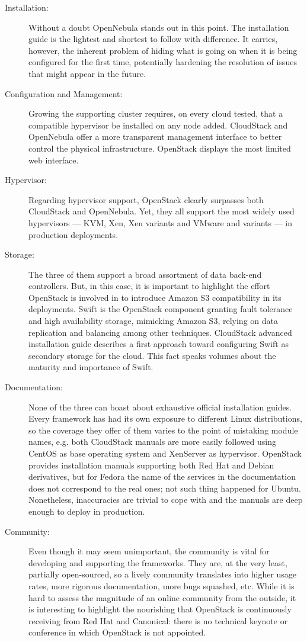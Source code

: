 \begin{description}
 \item[Installation:] Without a doubt OpenNebula stands out in this point. The installation guide is the lightest and shortest to follow with difference. It carries, however, the inherent problem of hiding what is going on when it is being configured for the first time, potentially hardening the resolution of issues that might appear in the future.
 \item[Configuration and Management:] Growing the supporting cluster requires, on every cloud tested, that a compatible hypervisor be installed on any node added. CloudStack and OpenNebula offer a more transparent management interface to better control the physical infrastructure. OpenStack displays the most limited web interface.
 \item[Hypervisor:] Regarding hypervisor support, OpenStack clearly surpasses both CloudStack and OpenNebula. Yet, they all support the most widely used hypervisors --- KVM, Xen, Xen variants and VMware and variants --- in production deployments.
 \item[Storage:] The three of them support a broad assortment of data back-end controllers. But, in this case, it is important to highlight the effort OpenStack is involved in to introduce Amazon S3 compatibility in its deployments. Swift is the OpenStack component granting fault tolerance and high availability storage, mimicking Amazon S3, relying on data replication and balancing among other techniques. CloudStack advanced installation guide \cite{cloudstackadvinstall} describes a first approach toward configuring Swift as secondary storage for the cloud. This fact speaks volumes about the maturity and importance of Swift.
 \item[Documentation:] None of the three can boast about exhaustive official installation guides. Every framework has had its own exposure to different Linux distributions, so the coverage they offer of them varies to the point of mistaking module names, e.g. both CloudStack manuals are more easily followed using CentOS as base operating system and XenServer as hypervisor. OpenStack provides installation manuals supporting both Red Hat and Debian derivatives, but for Fedora the name of the services in the documentation does not correspond to the real ones; not such thing happened for Ubuntu. Nonetheless, inaccuracies are trivial to cope with and the manuals are deep enough to deploy in production.
 \item[Community:] Even though it may seem unimportant, the community is vital for developing and supporting the frameworks. They are, at the very least, partially open-sourced, so a lively community translates into higher usage rates, more rigorous documentation, more bugs squashed, etc. While it is hard to assess the magnitude of an online community from the outside, it is interesting to highlight the nourishing that OpenStack is continuously receiving from Red Hat and Canonical: there is no technical keynote or conference in which OpenStack is not appointed.
\end{description} 

